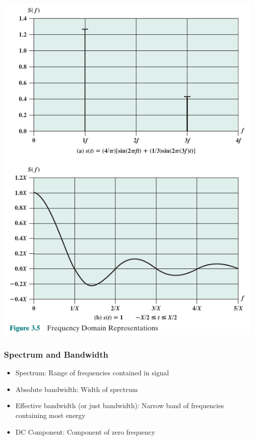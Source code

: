 \documentclass[pdflatex,compress]{beamer}
\begin{document}
\begin{frame}
	\begin{center}
		\includegraphics[height=0.9\textheight]{img/img05}
	\end{center}
\end{frame}

\begin{frame}
	\frametitle{Spectrum and Bandwidth}
	\begin{itemize}
		\item Spectrum: Range of frequencies contained in signal
		\item Absolute bandwidth: Width of spectrum
		\item Effective bandwidth (or just bandwidth): Narrow band of frequencies containing most energy
		\item DC Component: Component of zero frequency
	\end{itemize}
\end{frame}
\end{document}
